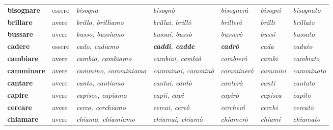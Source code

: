 \documentclass[11pt,a4paper,twoside,openright]{book}
\newcommand{\irr}[1]{{\color{exccol}\bfseries #1}}
\begin{document}
{\begin{xltabular}{\linewidth}{@{}>{\raggedright\arraybackslash}p{2.7cm} l L L l >{\raggedright\arraybackslash}p{1.9cm} l@{}}
\textbf{bisognare} & essere & \textit{bisogna} & \textit{bisognò} & \textit{bisognerà} & \textit{bisogni} & \textit{bisognato} \\
\textbf{brillare} & avere & \textit{brillo, brilliamo} & \textit{brillai, brillò} & \textit{brillerò} & \textit{brilli} & \textit{brillato} \\
\textbf{bussare} & avere & \textit{busso, bussiamo} & \textit{bussai, bussò} & \textit{busserò} & \textit{bussi} & \textit{bussato} \\
\textbf{cadere} & essere & \textit{cado, cadiamo} & \textit{\irr{caddi}, \irr{cadde}} & \textit{\irr{cadrò}} & \textit{cada} & \textit{caduto} \\
\textbf{cambiare} & avere & \textit{cambio, cambiamo} & \textit{cambiai, cambiò} & \textit{cambierò} & \textit{cambi} & \textit{cambiato} \\
\textbf{camminare} & avere & \textit{cammino, camminiamo} & \textit{camminai, camminò} & \textit{camminerò} & \textit{cammini} & \textit{camminato} \\
\textbf{cantare} & avere & \textit{canto, cantiamo} & \textit{cantai, cantò} & \textit{canterò} & \textit{canti} & \textit{cantato} \\
\textbf{capire} & avere & \textit{capisco, capiamo} & \textit{capii, capì} & \textit{capirò} & \textit{capisca} & \textit{capito} \\
\textbf{cercare} & avere & \textit{cerco, cerchiamo} & \textit{cercai, cercò} & \textit{cercherò} & \textit{cerchi} & \textit{cercato} \\
\textbf{chiamare} & avere & \textit{chiamo, chiamiamo} & \textit{chiamai, chiamò} & \textit{chiamerò} & \textit{chiami} & \textit{chiamato} \\

\end{xltabular}}
\end{document}
